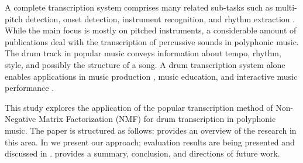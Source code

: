 \documentclass{article}
\begin{document}

A complete transcription system comprises many related sub-tasks such as multi-pitch detection, onset detection, instrument recognition, and rhythm extraction \cite{Benetos2013}. While the main focus is mostly on pitched instruments, a considerable amount of publications deal with the transcription of percussive sounds in polyphonic music. The drum track in popular music conveys information about tempo, rhythm, style, and possibly the structure of a song. A drum transcription system alone enables applications in music production \cite{Yoshii2007a}, music education, and interactive music performance \cite{Weinberg2009}.


This study explores the application of the popular transcription method of Non-Negative Matrix Factorization (NMF) for drum transcription in polyphonic music. The paper is structured as follows:  provides an overview of the research in this area. In  we present our approach; evaluation results are being presented and discussed in .  provides a summary, conclusion, and directions of future work.

\end{document}
